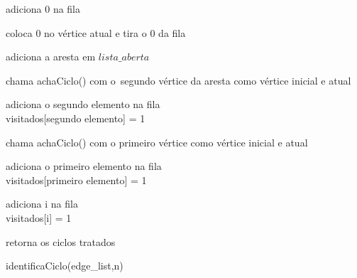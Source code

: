 \documentclass[a4paper, 11pt]{article}
\begin{document}
					\begin{algorithm}[H]
						
						
						adiciona 0 na fila\\
						
						{
							coloca 0 no vértice atual e tira o 0 da fila\\
							{
								{
									{
										adiciona a aresta em $lista\_aberta$
										
										{
											chama achaCiclo() com o\ segundo vértice da aresta como vértice inicial e atual
										}
									
										\Else 
										{
											adiciona o segundo elemento na fila\\
											
											visitados[segundo  elemento] = 1
										}
									}
								
									\Else
									{
										{
											{
												chama achaCiclo() com o primeiro vértice como vértice inicial e atual
											}
										
											\Else 
											{
												adiciona o primeiro elemento na fila\\
												
												visitados[primeiro  elemento] = 1
											}
										}
									}
								}
							}
						
						{
							{
								{
									adiciona i na fila\\
									visitados[i] = 1
								}
							}
							
						}
						
						
						}
					
						retorna os ciclos tratados
						\caption{identificaCiclo(edge\_list,n)}
						
					\end{algorithm}
				
\end{document}
